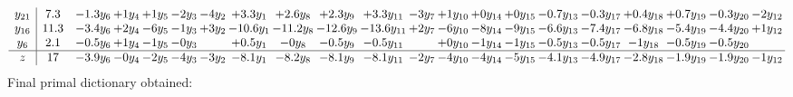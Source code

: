 \documentclass[11pt]{article}
\begin{document}
\[\begin{array}{c| c c@{\hskip 2pt} c@{\hskip 2pt} c@{\hskip 2pt} c@{\hskip 2pt} c@{\hskip 2pt} c@{\hskip 2pt} c@{\hskip 2pt} c@{\hskip 2pt} c@{\hskip 2pt} c@{\hskip 2pt} c@{\hskip 2pt} c@{\hskip 2pt} c@{\hskip 2pt} c@{\hskip 2pt} c@{\hskip 2pt} c@{\hskip 2pt} c@{\hskip 2pt} c@{\hskip 2pt} c@{\hskip 2pt} }
 y_{21}   &  7.3 & -1.3 y_{6} & + 1 y_{4} & + 1 y_{5} & -2 y_{3} & -4 y_{2} & + 3.3 y_{1} & + 2.6 y_{8} & + 2.3 y_{9} & + 3.3 y_{11} & -3 y_{7} & + 1 y_{10} & + 0 y_{14} & + 0 y_{15} & -0.7 y_{13} & -0.3 y_{17} & + 0.4 y_{18} & + 0.7 y_{19} & -0.3 y_{20} & -2 y_{12}\\
 y_{16}   &  11.3 & -3.4 y_{6} & + 2 y_{4} & -6 y_{5} & -1 y_{3} & + 3 y_{2} & -10.6 y_{1} & -11.2 y_{8} & -12.6 y_{9} & -13.6 y_{11} & + 2 y_{7} & -6 y_{10} & -8 y_{14} & -9 y_{15} & -6.6 y_{13} & -7.4 y_{17} & -6.8 y_{18} & -5.4 y_{19} & -4.4 y_{20} & + 1 y_{12}\\
 y_{6}   &  2.1 & -0.5 y_{6} & + 1 y_{4} & -1 y_{5} & -0 y_{3} &   & + 0.5 y_{1} & -0 y_{8} & -0.5 y_{9} & -0.5 y_{11} &   & + 0 y_{10} & -1 y_{14} & -1 y_{15} & -0.5 y_{13} & -0.5 y_{17} & -1 y_{18} & -0.5 y_{19} & -0.5 y_{20} &   \\
\hline
z    &  17 & -3.9 y_{6} & -0 y_{4} & -2 y_{5} & -4 y_{3} & -3 y_{2} & -8.1 y_{1} & -8.2 y_{8} & -8.1 y_{9} & -8.1 y_{11} & -2 y_{7} & -4 y_{10} & -4 y_{14} & -5 y_{15} & -4.1 y_{13} & -4.9 y_{17} & -2.8 y_{18} & -1.9 y_{19} & -1.9 y_{20} & -1 y_{12}\\
\end{array}\]
 Final primal dictionary obtained: 
\end{document}
